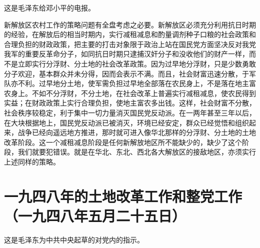 \documentclass[cn,11pt,chinese]{elegantbook}
\def\myformat#1{\hfil\hfil #1}
\begin{document}
\begin{introduction}\item  这是毛泽东给邓小平的电报。\end{introduction}
新解放区农村工作的策略问题有全盘考虑之必要。新解放区必须充分利用抗日时期的经验，在解放后的相当时期内，实行减租减息和酌量调剂种子口粮的社会政策和合理负担的财政政策，把主要的打击对象限于政治上站在国民党方面坚决反对我党我军的重要反革命分子，如同抗日时期只逮捕汉奸分子和没收他们的财产一样，而不是立即实行分浮财、分土地的社会改革政策。因为过早地分浮财，只是少数勇敢分子欢迎，基本群众并未分得，因而会表示不满。而且，社会财富迅速分散，于军队亦不利。过早地分土地，使军需负担过早地全部落在农民身上，不是落在地主富农身上。不如不分浮财，不分土地，在社会改革上普遍实行减租减息，使农民得到实益；在财政政策上实行合理负担，使地主富农多出钱。这样，社会财富不分散，社会秩序较稳定，利于集中一切力量消灭国民党反动派。在一两年甚至三年以后，在大块根据地上，国民党反动派已被消灭，环境已经安定，群众已经觉悟和组织起来，战争已经向遥远地方推进，那时就可进入像华北那样的分浮财、分土地的土地改革阶段。这一个减租减息阶段是任何新解放地区所不能缺少的，缺少了这个阶段，我们就要犯错误。就是在华北、东北、西北各大解放区的接敌地区，亦须实行上述同样的策略。\\
\newpage\section*{\myformat{一九四八年的土地改革工作和整党工作}\\\myformat{（一九四八年五月二十五日）}}
\begin{introduction}\item  这是毛泽东为中共中央起草的对党内的指示。\end{introduction}
\end{document}
